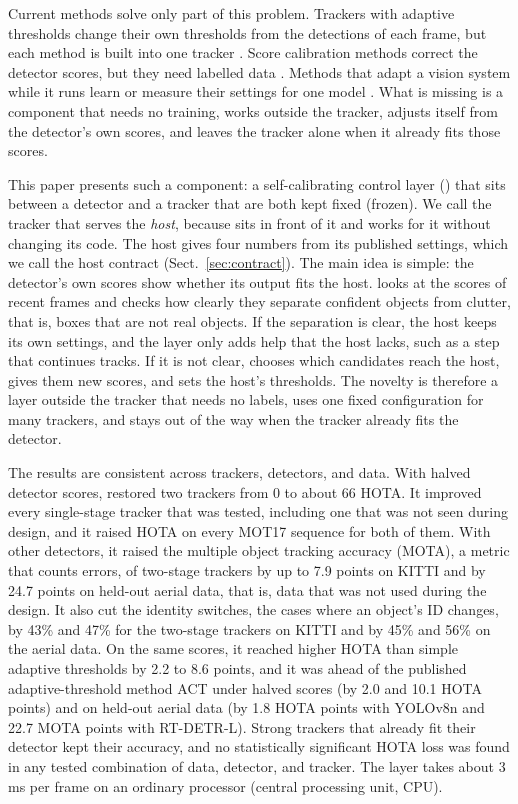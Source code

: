 Current methods solve only part of this problem. Trackers with adaptive
thresholds change their own thresholds from the detections of each frame, but
each method is built into one tracker
\cite{ma2023adaptivebytetrack,shim2024adaptrack,act2026adaptive}. Score
calibration methods correct the detector scores, but they need labelled data
\cite{kuppers2020detcalib}. Methods that adapt a vision system while it runs
learn or measure their settings for one model
\cite{han2022dynamic,jiang2018chameleon}. What is missing is a component that
needs no training, works outside the tracker, adjusts itself from the
detector's own scores, and leaves the tracker alone when it already fits those
scores.

This paper presents such a component: a self-calibrating control layer
(\scl{}) that sits between a detector and a tracker that are both kept fixed
(frozen). We call the tracker that \scl{} serves the \emph{host}, because
\scl{} sits in front of it and works for it without changing its code. The
host gives \scl{} four numbers from its published settings, which we call the
host contract (Sect.~\ref{sec:contract}). The main idea is simple: the
detector's own scores show whether its output fits the host. \scl{} looks at
the scores of recent frames and checks how clearly they separate confident
objects from clutter, that is, boxes that are not real objects. If the
separation is clear, the host keeps its own settings, and the layer only adds
help that the host lacks, such as a step that continues tracks. If it is not
clear, \scl{} chooses which candidates reach the host, gives them new scores,
and sets the host's thresholds. The novelty is therefore a layer outside the
tracker that needs no labels, uses one fixed configuration for many trackers,
and stays out of the way when the tracker already fits the detector.



The results are consistent across trackers, detectors, and data. With halved
detector scores, \scl{} restored two trackers from 0 to about 66 HOTA. It
improved every single-stage tracker that was tested, including one that was
not seen during design, and it raised HOTA on every MOT17 sequence for both of
them. With other detectors, it raised the multiple object tracking accuracy
(MOTA), a metric that counts errors, of two-stage trackers by up to 7.9 points
on KITTI and by 24.7 points on held-out aerial data, that is, data that was
not used during the design. It also cut the identity switches, the cases
where an object's ID changes, by 43\% and 47\% for the two-stage trackers on
KITTI and by 45\% and 56\% on the aerial data. On the same scores, it reached higher HOTA than
simple adaptive thresholds by 2.2 to 8.6 points, and it was ahead of the
published adaptive-threshold method ACT under halved scores (by 2.0 and 10.1
HOTA points) and on held-out aerial data (by 1.8 HOTA points with YOLOv8n and
22.7 MOTA points with RT-DETR-L). Strong trackers that already fit their
detector kept their accuracy, and no statistically significant HOTA loss was
found in any tested combination of data, detector, and tracker. The layer
takes about 3 ms per frame on an ordinary processor (central processing unit,
CPU).

